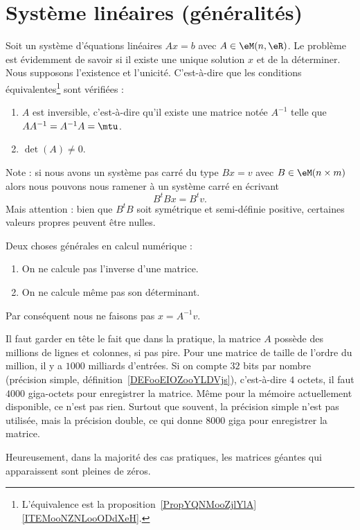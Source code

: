 \section{Système linéaires (généralités)}

Soit un système d'équations linéaires \( Ax=b\) avec \( A\in \eM(n,\eR)\). Le problème est évidemment de savoir si il existe une unique solution \( x\) et de la déterminer. Nous supposons l'existence et l'unicité. C'est-à-dire que les conditions équivalentes\footnote{L'équivalence est la proposition~\ref{PropYQNMooZjlYlA}\ref{ITEMooNZNLooODdXeH}.} sont vérifiées :
\begin{enumerate}
    \item
        \( A\) est inversible, c'est-à-dire qu'il existe une matrice notée \( A^{-1}\) telle que \( AA^{-1}=A^{-1}A=\mtu\).
    \item
        \( \det(A)\neq 0\).
\end{enumerate}
Note : si  nous avons un système pas carré du type \( Bx=v\) avec \( B\in \eM(n\times m)\) alors nous pouvons nous ramener à un système carré en écrivant
\begin{equation}
    B^tBx=B^tv.
\end{equation}
Mais attention : bien que \( B^tB\) soit symétrique et semi-définie positive, certaines valeurs propres peuvent être nulles.

\begin{normaltext}
    Deux choses générales en calcul numérique :
    \begin{enumerate}
        \item
            On ne calcule pas l'inverse d'une matrice.
        \item
            On ne calcule même pas son déterminant.
    \end{enumerate}
    Par conséquent nous ne faisons pas \( x=A^{-1}v\).

    Il faut garder en tête le fait que dans la pratique, la matrice \( A\) possède des millions de lignes et colonnes, si pas pire. Pour une matrice de taille de l'ordre du million, il y a \( 1000\) milliards d'entrées. Si on compte \( 32\) bits par nombre (précision simple, définition~\ref{DEFooEIOZooYLDVjs}), c'est-à-dire \( 4\) octets, il faut \( 4000\) giga-octets pour enregistrer la matrice. Même pour la mémoire actuellement disponible, ce n'est pas rien. Surtout que souvent, la précision simple n'est pas utilisée, mais la précision double, ce qui donne \( 8000\) giga pour enregistrer la matrice.

    Heureusement, dans la majorité des cas pratiques, les matrices géantes qui apparaissent sont pleines de zéros.

\end{normaltext}

